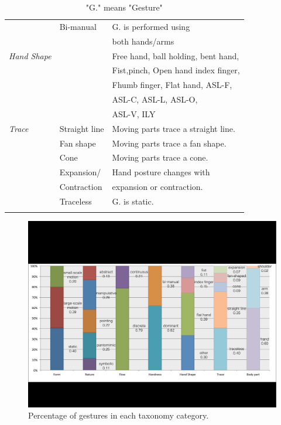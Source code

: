 \documentclass{sigchi}
\begin{document}
\begin{table}
\begin{adjustwidth}{-0.4cm}{}
\begin{tabular}{|l|l|l|}
    &Bi-manual&G. is performed using \\&&both hands/arms\\
    \Xhline{4\arrayrulewidth}
    \em{Hand Shape} &&Free hand, ball holding, bent hand,\\&& Fist,pinch, Open hand
    index finger,\\&&Fhumb finger, Flat hand, ASL-F,\\&&ASL-C, ASL-L, ASL-O, \\&&ASL-V, ILY\\
    \Xhline{4\arrayrulewidth}
    \em{Trace}&Straight line&Moving parts trace a straight line.\\ \cline{2-3}
    &Fan shape&Moving parts trace a fan shape.\\ \cline{2-3}
    &Cone&Moving parts trace a cone.\\ \cline{2-3}
    &Expansion/&Hand posture changes with \\&Contraction&expansion or contraction.\\
     \cline{2-3}
    &Traceless&G. is static.\\
    \Xhline{4\arrayrulewidth}
  \end{tabular}
  \caption{"G." means "Gesture"}
  \label{tab:classificationTable}
  \end{adjustwidth}
\end{table}

\begin{figure}[!h]
\centering
\includegraphics[width=1\columnwidth]{taxonomy.pdf}
\caption{Percentage of gestures in each taxonomy category.}
\label{fig:taxonomyFigure}
\end{figure}
\end{document}
